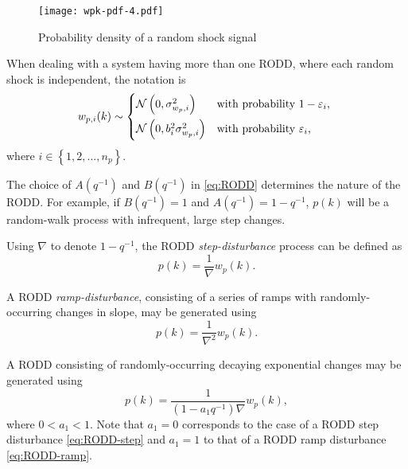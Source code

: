 {\begin{figure}[ht]
	\centering
	\texttt{[image: wpk-pdf-4.pdf]}
	\caption{Probability density of a random shock signal}
	\label{fig:wpk-pdf}
\end{figure}

When dealing with a system having more than one \gls{RODD}, where each random shock is independent, the notation is
\begin{equation} \label{eq:wpik2}
	w_{p,i}(k) \sim 
	\begin{cases*}
		\mathcal{N}\left(0, \sigma_{w_p,i}^2\right) & with probability $1-\varepsilon_i$, \\
		\mathcal{N}\left(0, b_i^2\sigma_{w_p,i}^2\right) & with probability $\varepsilon_i$,
	\end{cases*}
\end{equation}
where $i \in \left\{1, 2, ..., n_p\right\}$.
%

The choice of $A(q^{-1})$ and $B(q^{-1})$ in \eqref{eq:RODD} determines the nature of the \gls{RODD}. For example, if $B(q^{-1})=1$ and $A(q^{-1})=1-q^{-1}$, $p(k)$ will be a random-walk process with infrequent, large step changes.

Using $\nabla$ to denote $1-q^{-1}$, the \gls{RODD} \textit{step-disturbance} process can be defined as
%
\begin{equation} \label{eq:RODD-step}
	p(k) = \frac{1}{\nabla}w_p(k).
\end{equation}

A \gls{RODD} \textit{ramp-disturbance}, consisting of a series of ramps with randomly-occurring changes in slope, may be generated using
\begin{equation} \label{eq:RODD-ramp}
	p(k) = \frac{1}{\nabla^2}w_p(k).
\end{equation}

A \gls{RODD} consisting of randomly-occurring decaying exponential changes may be generated using
\begin{equation} \label{eq:RODD-exp}
	p(k) = \frac{1}{(1-a_1q^{-1})\nabla}w_p(k),
\end{equation}
where  $0<a_1<1$. Note that $a_1=0$ corresponds to the case of a \gls{RODD} step disturbance \eqref{eq:RODD-step} and $a_1=1$ to that of a \gls{RODD} ramp disturbance \eqref{eq:RODD-ramp}. 

}

